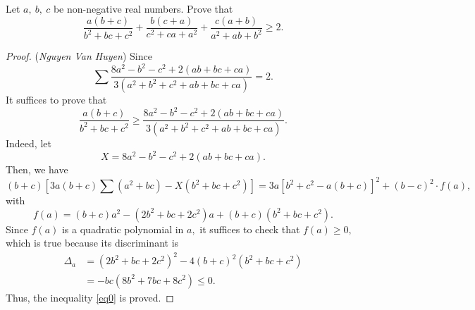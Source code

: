 \documentclass[12pt,a4paper]{book}
\begin{document}
\begin{pro_no_count}
Let $a, \ b, \ c$ be non-negative real numbers. Prove that
\[\frac{a(b+c)}{b^2+bc+c^2}+\frac{b(c+a)}{c^2+ca+a^2}+\frac{c(a+b)}{a^2+ab+b^2} \geqslant 2.\]
\end{pro_no_count}

\begin{proof}
(\textit{Nguyen Van Huyen}) Since
\[\sum \frac{8a^2 - b^2 - c^2 + 2(ab+bc+ca)}{3(a^2+b^2+c^2+ab+bc+ca)} = 2.\]
It suffices to prove that
\begin{equation}\label{eq0}
\frac{a(b+c)}{b^2+bc+c^2} \geqslant \frac{8a^2 - b^2 - c^2 + 2(ab+bc+ca)}{3(a^2+b^2+c^2+ab+bc+ca)}.
\end{equation}
Indeed, let
\[X = 8a^2 - b^2 - c^2 + 2(ab+bc+ca).\]
Then, we have
\[(b+c)\left[3a(b+c)\sum (a^2 + bc) - X(b^2+bc+c^2)\right] =3a[b^2+c^2-a(b+c)]^2 + (b-c)^2 \cdot f(a),\]
with
\[f(a) = (b+c)a^2 - (2b^2+bc+2c^2)a + (b+c)(b^2+bc+c^2).\]
Since $f(a)$ is a quadratic polynomial in $a,$ it suffices to check that $f(a) \ge 0,$ which is true because its discriminant is
\[\begin{aligned} 
\Delta_{a} &= (2b^2+bc+2c^2)^2 - 4(b+c)^2(b^2+bc+c^2) \\
& = - bc(8b^2+7bc+8c^2) \leqslant 0.
\end{aligned}\]
Thus, the inequality \eqref{eq0} is proved.
\end{proof}
\end{document}

